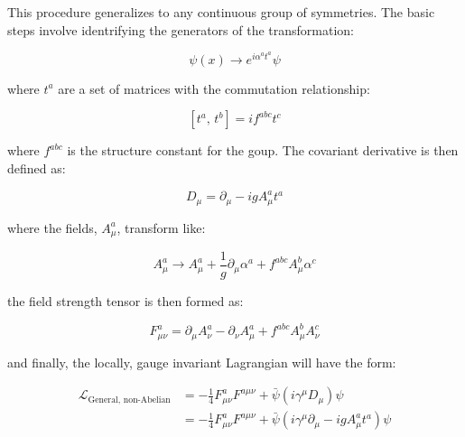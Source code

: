 \par This procedure generalizes to any continuous group of
symmetries.  The basic steps involve identrifying the generators of
the transformation:

\begin{equation}\label{eq:yang_mills_general_transformation}
\psi(x) \rightarrow e^{i\alpha^{a}t^{a}} \psi
\end{equation}

\noindent where $t^{a}$ are a set of matrices with the commutation
relationship:

\begin{equation}\label{eq:yang_mills_general_commutator}
[t^{a} \text{, } t^{b}]  = if^{abc}t^{c}
\end{equation}

\noindent where $f^{abc}$ is the structure constant for the goup.  The
covariant derivative is then defined as:

\begin{equation}\label{eq:yang_mills_general_covariant_derivative}
D_{\mu} = \partial_{\mu} - igA_{\mu}^{a}t^{a}
\end{equation}

\noindent where the fields, $A_{\mu}^{a}$, transform like:

\begin{equation}\label{eq:yang_mills_general_vector_transformation}
A_{\mu}^{a} \rightarrow A_{\mu}^{a} +
\frac{1}{g}\partial_{\mu}\alpha^{a} + f^{abc}A_{\mu}^{b}\alpha^{c}
\end{equation}

\noindent the field strength tensor is then formed as:

\begin{equation}\label{eq:yang_mills_general_field_strength_tensor}
F_{\mu\nu}^{a} = \partial_{\mu}A_{\nu}^{a} - \partial_{\nu}A_{\mu}^{a}
+ f^{abc}A_{\mu}^{b}A_{\nu}^{c}
\end{equation}

\noindent and finally, the locally, gauge invariant Lagrangian will
have the form:

\begin{equation}\label{eq:yang_mills_general_invariant_lagrangian}
\begin{aligned}
\mathcal{L}_{\text{General, non-Abelian}} & =
  -\frac{1}{4}F_{\mu\nu}^{a}F^{a\mu\nu} +
  \bar{\psi}(i\gamma^{\mu}D_{\mu})\psi \\
& = -\frac{1}{4}F_{\mu\nu}^{a}F^{a\mu\nu} +
  \bar{\psi}(i\gamma^{\mu}\partial_{\mu} - igA_{\mu}^{a}t^{a})\psi 
\end{aligned}
\end{equation}

